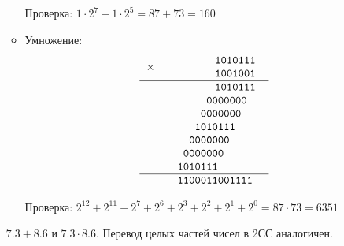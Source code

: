 \documentclass[oneside,a4paper,14pt]{extarticle} %
\begin{document}
\begin{enumerate}
\begin{itemize}
            Проверка: $1\cdot2^7+1\cdot2^5 = 87+73 = 160$

                \item Умножение:
            $$
                \begin{tabular}{{c}{c}}
                \texttt{$\times$ }&
                \begin{tabular}{c}
                \texttt{~~~~~~~1010111}\\
                \texttt{~~~~~~~1001001}\\
                \end{tabular} \\ 
                \hline
                & \texttt{~~~~~~~1010111}\\
                & \texttt{~~~~~0000000~~}\\
                & \texttt{~~~~0000000~~~}\\
                & \texttt{~~~1010111~~~~}\\
                & \texttt{~~0000000~~~~~}\\
                & \texttt{~0000000~~~~~~}\\
                & \texttt{1010111~~~~~~~}\\
                \hline
                & \texttt{1100011001111}
                \end{tabular}
            $$

            Проверка: $2^{12}+2^{11}+2^7+2^6+2^3+2^2+2^1+2^0 = 87 \cdot 73 = 6351$

            \end{itemize}

            $7.3+8.6$ и $7.3\cdot8.6$. Перевод целых частей чисел в 2СС аналогичен.


\end{enumerate}
\end{document}
